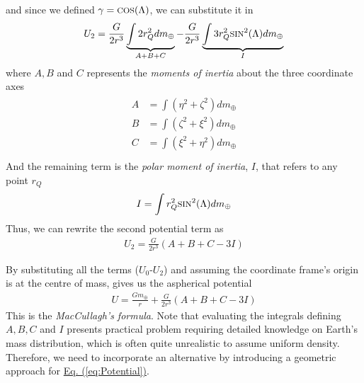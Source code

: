 \begin{multicols}{2}
\begin{enumerate}
    and since we defined $\gamma = \text{\footnotesize{COS}}(\Lambda)$, we can substitute it in
    \begin{gather}
        U_2 = \frac{G}{2r^3}\underbrace{\int2r_Q^2dm_\oplus}_{A+B+C} - \frac{G}{2r^3}\underbrace{\int3r_Q^2\text{\footnotesize{SIN}}^2(\Lambda)dm_\oplus}_{I}
    \end{gather}
    where $A,B$ and $C$ represents the \textit{moments of inertia} about the three coordinate axes 
    \begin{gather}
        \begin{split}
            A &= \int(\eta^2+\zeta^2)dm_\oplus\\
            B &= \int(\zeta^2+\xi^2)dm_\oplus\\
            C &= \int(\xi^2+\eta^2)dm_\oplus\\
        \end{split}
    \end{gather}
    And the remaining term is the \textit{polar moment of inertia}, $I$, that refers to any point $r_Q$
    \begin{gather}
        I = \int r_Q^2\text{\footnotesize{SIN}}^2(\Lambda)dm_\oplus
    \end{gather}
    Thus, we can rewrite the second potential term as
    \begin{gather}
        U_2 = \frac{G}{2r^3}(A+B+C-3I)
    \end{gather}
\end{enumerate}

By substituting all the terms ($U_0$-$U_2$) and assuming the coordinate frame's origin is at the centre of mass, gives us the aspherical potential 
\begin{gather}
    U = \frac{Gm_\oplus}{r}+\frac{G}{2r^3}(A+B+C-3I)
\end{gather}
This is the \textit{MacCullagh's formula}. Note that evaluating the integrals defining $A,B,C$ and $I$ presents practical problem requiring detailed knowledge on Earth's mass distribution, which is often quite unrealistic to assume uniform density. Therefore, we need to incorporate an alternative by introducing a geometric approach for \hyperref[eq:Potential]{Eq. (\ref*{eq:Potential})}.


\end{multicols}

